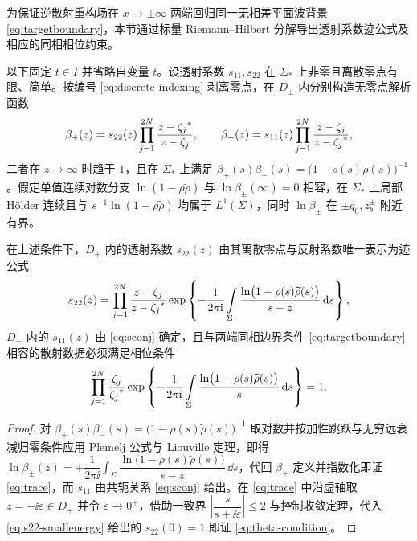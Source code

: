 为保证逆散射重构场在 $x\to\pm\infty$ 两端回归同一无相差平面波背景 \eqref{eq:targetboundary}，本节通过标量 Riemann--Hilbert 分解导出透射系数迹公式及相应的同相相位约束。

以下固定 $t\in I$ 并省略自变量 $t$。设透射系数 $s_{11},s_{22}$ 在 $\Sigma_*$ 上非零且离散零点有限、简单。按编号 \eqref{eq:discrete-indexing} 剥离零点\cite{Fan2022,ZhangFan2020}，在 $D_\pm$ 内分别构造无零点解析函数
\begin{equation*}
\beta_+(z)=s_{22}(z)\prod\limits_{j=1}^{2N}\dfrac{z-{\zeta_j}^{*}}{z-\zeta_j},\qquad
\beta_-(z)=s_{11}(z)\prod\limits_{j=1}^{2N}\dfrac{z-\zeta_j}{z-{\zeta_j}^{*}},
\end{equation*}
二者在 $z\to\infty$ 时趋于 $1$，且在 $\Sigma_*$ 上满足 $\beta_+(s)\beta_-(s)=\bigl(1-\rho(s)\widetilde\rho(s)\bigr)^{-1}$。假定单值连续对数分支 $\ln(1-\rho\widetilde\rho)$ 与 $\ln\beta_\pm(\infty)=0$ 相容，在 $\Sigma_*$ 上局部 H\"older 连续且与 $s^{-1}\ln(1-\rho\widetilde\rho)$ 均属于 $L^1(\Sigma)$，同时 $\ln\beta_\pm$ 在 $\pm q_0,z_b^\pm$ 附近有界。

\begin{proposition}\label{prop:theta}
在上述条件下，$D_+$ 内的透射系数 $s_{22}(z)$ 由其离散零点与反射系数唯一表示为迹公式
\begin{equation}\label{eq:trace}
s_{22}(z)=\prod\limits_{j=1}^{2N}\dfrac{z-\zeta_j}{z-{\zeta_j}^{*}}
\exp\left\{-\dfrac{1}{2\pi\mathrm{i}}\int\limits_\Sigma\dfrac{\ln\bigl(1-\rho(s)\widetilde\rho(s)\bigr)}{s-z}\,\mathrm{d} s\right\},
\end{equation}
$D_-$ 内的 $s_{11}(z)$ 由 \eqref{eq:sconj} 确定，且与两端同相边界条件 \eqref{eq:targetboundary} 相容的散射数据必须满足相位条件
\begin{equation}\label{eq:theta-condition}
\prod\limits_{j=1}^{2N}\dfrac{\zeta_j}{{\zeta_j}^{*}}
\exp\left\{-\dfrac{1}{2\pi\mathrm{i}}\int\limits_\Sigma\dfrac{\ln\bigl(1-\rho(s)\widetilde\rho(s)\bigr)}{s}\,\mathrm{d} s\right\}=1.
\end{equation}
\end{proposition}
\begin{proof}
对 $\beta_+(s)\beta_-(s)=\bigl(1-\rho(s)\widetilde\rho(s)\bigr)^{-1}$ 取对数并按加性跳跃与无穷远衰减归零条件应用 Plemelj 公式与 Liouville 定理，即得 $\ln\beta_\pm(z)=\mp\dfrac{1}{2\pi\ii}\int_\Sigma\dfrac{\ln\bigl(1-\rho(s)\widetilde\rho(s)\bigr)}{s-z}\,\dd s$，代回 $\beta_+$ 定义并指数化即证 \eqref{eq:trace}，而 $s_{11}$ 由共轭关系 \eqref{eq:sconj} 给出。在 \eqref{eq:trace} 中沿虚轴取 $z=-\ii\varepsilon\in D_+$ 并令 $\varepsilon\to0^+$，借助一致界 $\left|\dfrac{s}{s+\ii\varepsilon}\right|\le2$ 与控制收敛定理，代入 \eqref{eq:s22-smallenergy} 给出的 $s_{22}(0)=1$ 即证 \eqref{eq:theta-condition}。
\end{proof}

